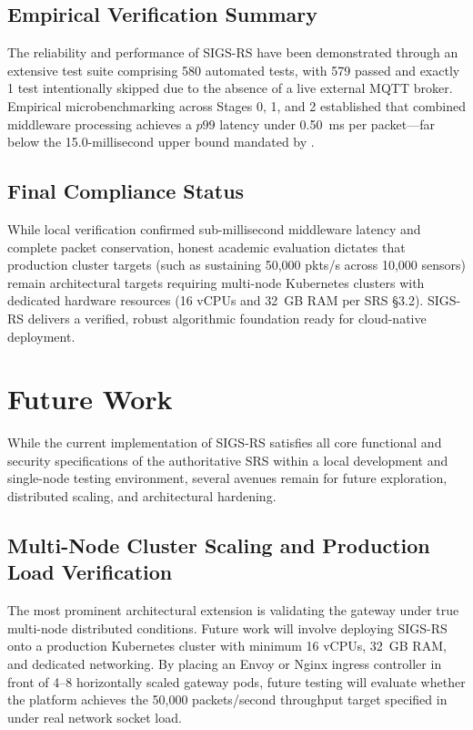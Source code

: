 \documentclass[a4paper]{article}
\begin{document}
\subsection{Empirical Verification Summary}
The reliability and performance of SIGS-RS have been demonstrated through an extensive test suite comprising 580 automated tests, with 579 passed and exactly 1 test intentionally skipped due to the absence of a live external MQTT broker. Empirical microbenchmarking across Stages 0, 1, and 2 established that combined middleware processing achieves a $p99$ latency under 0.50~ms per packet---far below the 15.0-millisecond upper bound mandated by .

\subsection{Final Compliance Status}
While local verification confirmed sub-millisecond middleware latency and complete packet conservation, honest academic evaluation dictates that production cluster targets (such as  sustaining 50,000 pkts/s across 10,000 sensors) remain architectural targets requiring multi-node Kubernetes clusters with dedicated hardware resources (16 vCPUs and 32~GB RAM per SRS §3.2). SIGS-RS delivers a verified, robust algorithmic foundation ready for cloud-native deployment.

\section{Future Work}

While the current implementation of SIGS-RS satisfies all core functional and security specifications of the authoritative SRS within a local development and single-node testing environment, several avenues remain for future exploration, distributed scaling, and architectural hardening.

\subsection{Multi-Node Cluster Scaling and Production Load Verification}
The most prominent architectural extension is validating the gateway under true multi-node distributed conditions. Future work will involve deploying SIGS-RS onto a production Kubernetes cluster with minimum 16 vCPUs, 32~GB RAM, and dedicated networking. By placing an Envoy or Nginx ingress controller in front of 4--8 horizontally scaled gateway pods, future testing will evaluate whether the platform achieves the 50,000 packets/second throughput target specified in  under real network socket load.
\end{document}
